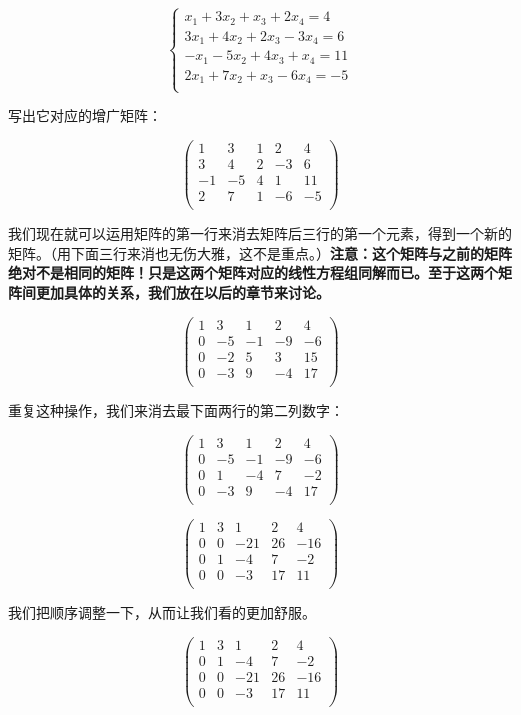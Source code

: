 \documentclass[a4paper]{ctexart}
\begin{document}
$$
\begin{cases}
x_{1}+3x_{2}+x_{3}+2x_{4}=4\\
3x_{1}+4x_{2}+2x_{3}-3x_{4}=6\\
-x_{1}-5x_{2}+4x_{3}+x_{4}=11\\
2x_{1}+7x_{2}+x_{3}-6x_{4}=-5\\
\end{cases}
$$

写出它对应的增广矩阵：

$$
\begin{pmatrix}
1&3&1&2&4\\
3&4&2&-3&6\\
-1&-5&4&1&11\\
2&7&1&-6&-5\\
\end{pmatrix}
$$

我们现在就可以运用矩阵的第一行来消去矩阵后三行的第一个元素，得到一个新的矩阵。（用下面三行来消也无伤大雅，这不是重点。）\textbf{注意：这个矩阵与之前的矩阵绝对不是相同的矩阵！只是这两个矩阵对应的线性方程组同解而已。至于这两个矩阵间更加具体的关系，我们放在以后的章节来讨论。}

$$
\begin{pmatrix}
1&3&1&2&4\\
0&-5&-1&-9&-6\\
0&-2&5&3&15\\
0&-3&9&-4&17\\
\end{pmatrix}
$$

重复这种操作，我们来消去最下面两行的第二列数字：

$$
\begin{pmatrix}
1&3&1&2&4\\
0&-5&-1&-9&-6\\
0&1&-4&7&-2\\
0&-3&9&-4&17\\
\end{pmatrix}
$$

$$
\begin{pmatrix}
1&3&1&2&4\\
0&0&-21&26&-16\\
0&1&-4&7&-2\\
0&0&-3&17&11\\
\end{pmatrix}
$$

我们把顺序调整一下，从而让我们看的更加舒服。

$$
\begin{pmatrix}
1&3&1&2&4\\
0&1&-4&7&-2\\
0&0&-21&26&-16\\
0&0&-3&17&11\\
\end{pmatrix}
$$
\end{document}
